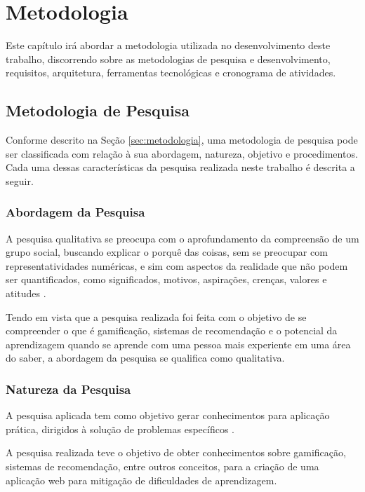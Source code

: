 \chapter[Metodologia]{Metodologia}
\label{cap:metodologia}
Este capítulo irá abordar a metodologia utilizada no desenvolvimento deste trabalho, discorrendo sobre as metodologias de pesquisa e desenvolvimento, requisitos, arquitetura, ferramentas tecnológicas e cronograma de atividades.

\section[Metodologia de Pesquisa]{Metodologia de Pesquisa}
Conforme descrito na Seção \ref{sec:metodologia}, uma metodologia de pesquisa pode ser classificada com relação à sua abordagem, natureza, objetivo e procedimentos. Cada uma dessas características da pesquisa realizada neste trabalho é descrita a seguir.

\subsection[Abordagem da Pesquisa]{Abordagem da Pesquisa}

A pesquisa qualitativa se preocupa com o aprofundamento da compreensão de um grupo social, buscando explicar o porquê das coisas, sem se preocupar com representatividades numéricas, e sim com aspectos da realidade que não podem ser quantificados, como significados, motivos, aspirações, crenças, valores e atitudes \cite{gerhardt2009metodos}.

Tendo em vista que a pesquisa realizada foi feita com o objetivo de se compreender o que é gamificação, sistemas de recomendação e o potencial da aprendizagem quando se aprende com uma pessoa mais experiente em uma área do saber, a abordagem da pesquisa se qualifica como qualitativa.

\subsection[Natureza da Pesquisa]{Natureza da Pesquisa}

A pesquisa aplicada tem como objetivo gerar conhecimentos para aplicação prática, dirigidos à solução de problemas específicos \cite{gerhardt2009metodos}.

A pesquisa realizada teve o objetivo de obter conhecimentos sobre gamificação, sistemas de recomendação, entre outros conceitos, para a criação de uma aplicação web para mitigação de dificuldades de aprendizagem.

